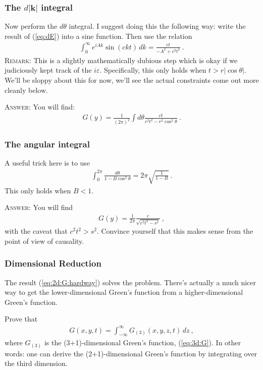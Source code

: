 \documentclass[12pt]{article}
\numberwithin{equation}{subsection}    %
\renewcommand{\vec}[1]{\mathbf{#1}} %
\begin{document}
\subsubsection{The $d|\vec k|$ integral}

Now perform the $d\theta$ integral. I suggest doing this the following way: write the result of (\ref{eq:dE}) into a sine function. Then use the relation
\begin{align}
	\int_0^\infty e^{iAk}\sin(ckt)\, dk = \frac{ct}{-A^2 + c^2t^2} \ .
\end{align}
\textsc{Remark:} This is a slightly mathematically dubious step which is okay if we judiciously kept track of the $i\varepsilon$. Specifically, this only holds when $t > r|\cos\theta|$. We'll be sloppy about this for now, we'll see the actual constraints come out more cleanly below.

\textsc{Answer}: You will find:
\begin{align}
	G(y) = \frac{1}{(2\pi)^2} \int d\theta \frac{ct}{c^2t^2 - r^2\cos^2\theta} \ .
\end{align}

\subsubsection{The angular integral}

A useful trick here is to use
\begin{align}
	\int_0^{2\pi} \frac{d\theta}{1-B\cos^2\theta} = 2\pi \sqrt{\frac{1}{1-B}} \ .
\end{align}
This only holds when $B<1$. 

\textsc{Answer}: You will find
\begin{align}
	G(y) = \frac{1}{2\pi} \frac{c}{\sqrt{c^2 t^2 - s^2}} \ ,
	\label{eq:2d:G:hardway}
\end{align}
with the caveat that $c^2t^2 > s^2$. Convince yourself that this makes sense from the point of view of causality.


\subsubsection{Dimensional Reduction}


The result (\ref{eq:2d:G:hardway}) solves the problem. 
%
There's actually a much nicer way to get the lower-dimensional Green's function from a higher-dimensional Green's function. 

Prove that 
\begin{align}
	G(x,y,t) = \int_{-\infty}^\infty G_{(3)}(x,y,z,t) \, dz \ ,
	\label{eq:G:from:G3}
\end{align}
where $G_{(3)}$ is the (3+1)-dimensional Green's function, (\ref{eq:3d:G}). In other words: one can derive the (2+1)-dimensional Green's function by integrating over the third dimension.
\end{document}
